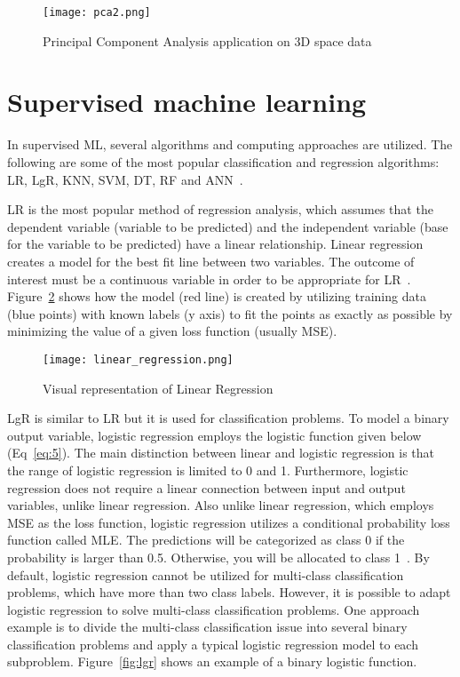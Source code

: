 \begin{figure}[htbp]
    \centering
    \texttt{[image: pca2.png]}
    \caption{Principal Component Analysis application on 3D space data~\cite{Sarker2021MachineDirections}}
    \label{fig:pca2}
\end{figure}


\section{Supervised machine learning}

In supervised \gls{ML}, several algorithms and computing approaches are utilized. The following are some of the most popular classification and regression algorithms: \gls{LR}, \gls{LgR}, \gls{KNN}, \gls{SVM}, \gls{DT}, \gls{RF} and \gls{ANN}~\cite{2020WhatIBM,Chugh2018TypesKnow}.

\gls{LR} is the most popular method of regression analysis, which assumes that the dependent variable (variable to be predicted) and the independent variable (base for the variable to be predicted) have a linear relationship. Linear regression creates a model for the best fit line between two variables. The outcome of interest must be a continuous variable in order to be appropriate for \gls{LR}~\cite{Worster2007UnderstandingAnalyses}. Figure~\ref{fig:linear_regression} shows how the model (red line) is created by utilizing training data (blue points) with known labels (y axis) to fit the points as exactly as possible by minimizing the value of a given loss function (usually \gls{MSE}).

\begin{figure}[htbp]
    \centering
    \texttt{[image: linear\_regression.png]}
    \caption{Visual representation of Linear Regression~\cite{Nasteski2017AnMethods}}
    \label{fig:linear_regression}
\end{figure}

\gls{LgR} is similar to \gls{LR} but it is used for classification problems. To model a binary output variable, logistic regression employs the logistic function given below (Eq~\ref{eq:5}). The main distinction between linear and logistic regression is that the range of logistic regression is limited to 0 and 1. Furthermore, logistic regression does not require a linear connection between input and output variables, unlike linear regression. Also unlike linear regression, which employs \gls{MSE} as the loss function, logistic regression utilizes a conditional probability loss function called \gls{MLE}. The predictions will be categorized as class 0 if the probability is larger than 0.5. Otherwise, you will be allocated to class 1~\cite{Belyadi2021SupervisedLearning}. By default, logistic regression cannot be utilized for multi-class classification problems, which have more than two class labels. However, it is possible to adapt logistic regression to solve  multi-class classification problems. One approach example is to divide the multi-class classification issue into several binary classification problems and apply a typical logistic regression model to each subproblem. 
Figure~\ref{fig:lgr} shows an example of a binary logistic function. 

